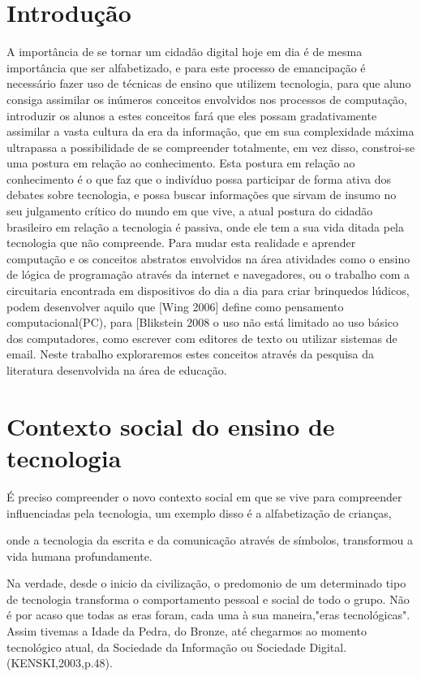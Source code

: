 \documentclass[article, 11pt, oneside, a4paper, english, brazil, sumario=tradicional]{abntex2}
\begin{document}
\section{Introdução}
    A importância de se tornar um cidadão digital hoje em dia é de mesma importância
que ser alfabetizado, e para este processo de emancipação é necessário fazer uso
de técnicas de ensino que utilizem tecnologia, para que aluno consiga assimilar
os inúmeros conceitos envolvidos nos processos de computação, introduzir os
alunos a estes conceitos fará que eles possam gradativamente assimilar a vasta
cultura da era da informação,  que em sua complexidade máxima ultrapassa a
possibilidade de se compreender totalmente, em vez disso, constroi-se uma
postura em relação ao conhecimento. Esta postura em relação ao conhecimento é o
que faz que o indivíduo possa participar de forma ativa dos debates sobre
tecnologia, e possa buscar informações que sirvam de insumo no seu julgamento
crítico do mundo em que vive, a atual postura do cidadão brasileiro em relação a
tecnologia é passiva, onde ele tem a sua vida ditada pela tecnologia que não
compreende.
    Para mudar esta realidade e aprender computação e os conceitos abstratos
envolvidos na área atividades como o ensino de lógica de programação através
da internet e navegadores, ou o trabalho com a circuitaria encontrada em
dispositivos do dia a dia para criar brinquedos lúdicos, podem desenvolver aquilo
que [Wing 2006] define como pensamento computacional(PC), para [Blikstein 2008 o uso não
está limitado ao uso básico dos computadores, como escrever com editores de texto ou utilizar sistemas
de email.
    Neste trabalho exploraremos estes conceitos através da pesquisa da literatura
desenvolvida na área de educação.

\section{Contexto social do ensino de tecnologia}
    É preciso compreender o novo contexto social em que se vive para compreender
influenciadas pela tecnologia, um exemplo disso é a alfabetização de crianças,

onde a tecnologia da escrita e da comunicação através de símbolos, transformou a
vida humana profundamente.

\begin{citacao}
Na verdade, desde o inicio da civilização, o predomonio de um determinado tipo
de tecnologia transforma o comportamento pessoal e social de todo o grupo. Não é
por acaso que todas as eras foram, cada uma à sua maneira,"eras tecnológicas".
Assim tivemas a Idade da Pedra, do Bronze, até chegarmos ao momento tecnológico
atual, da Sociedade da Informação ou Sociedade Digital. (KENSKI,2003,p.48).
\end{citacao}
\end{document}
